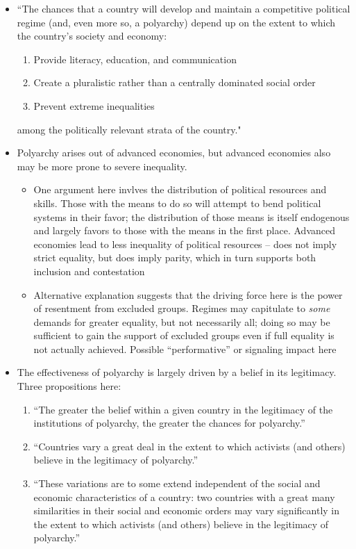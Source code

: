 \documentclass[12pt]{article}
\begin{document}
\begin{itemize}[leftmargin=*, itemsep=4pt]
    \item ``The chances that a country will develop and maintain a competitive political regime (and, even more so, a polyarchy) depend up on the extent to which the country's society and economy:
    \begin{enumerate}
        \item Provide literacy, education, and communication
        \item Create a pluralistic rather than a centrally dominated social order
        \item Prevent extreme inequalities
    \end{enumerate}
    among the politically relevant strata of the country."
    \item Polyarchy arises out of advanced economies, but advanced economies also may be more prone to severe inequality.
     \begin{itemize}
        \item One argument here invlves the distribution of political resources and skills. Those with the means to do so will attempt to bend political systems in their favor; the distribution of those means is itself endogenous and largely favors to those with the means in the first place. Advanced economies lead to less inequality of political resources -- does not imply strict equality, but does imply parity, which in turn supports both inclusion and contestation
        \item Alternative explanation suggests that the driving force here is the power of resentment from excluded groups. Regimes may capitulate to \emph{some} demands for greater equality, but not necessarily all; doing so may be sufficient to gain the support of excluded groups even if full equality is not actually achieved. Possible ``performative'' or signaling impact here
    \end{itemize}
    \item The effectiveness of polyarchy is largely driven by a belief in its legitimacy. Three propositions here:
    \begin{enumerate}
        \item ``The greater the belief within a given country in the legitimacy of the institutions of polyarchy, the greater the chances for polyarchy.''
        \item ``Countries vary a great deal in the extent to which activists (and others) believe in the legitimacy of polyarchy.''
        \item ``These variations are to some extend independent of the social and economic characteristics of a country: two countries with a great many similarities in their social and economic orders may vary significantly in the extent to which activists (and others) believe in the legitimacy of polyarchy.''

\end{enumerate}
\end{itemize}
\end{document}
